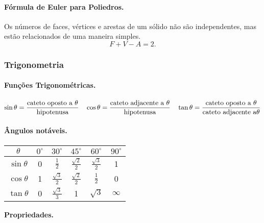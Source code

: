 \paragraph{Fórmula de Euler para Poliedros.} Os números de faces, vértices e arestas de um sólido não são independentes, mas estão relacionados de uma maneira simples.
$$F + V - A = 2.$$

\subsubsection{Trigonometria}
\paragraph{Funções Trigonométricas.}
	$$\sin\theta = \frac{\textnormal{cateto oposto a }\theta}{\textnormal{hipotenusa}}  \quad \cos\theta = \frac{\textnormal{cateto adjacente a }\theta}{\textnormal{hipotenusa}} \quad \tan\theta = \frac{\textnormal{cateto oposto a }\theta}{\textnormal{cateto adjacente a}\theta}$$

\paragraph{Ângulos notáveis.}

\begin{center}
	\begin{tabular}{|c|c c c c c|}
		$\theta$ & $0^{\circ}$ & $30^{\circ}$&$45^{\circ}$&$60^{\circ}$&$90^{\circ}$ \\
		\hline
		\rule{0pt}{0.5cm}$\sin\theta$ &0&$\frac{1}{2}$&$\frac{\sqrt{2}}{2}$&$\frac{\sqrt{3}}{2}$&1 \\
		\hline
		\rule{0pt}{0.5cm}$\cos\theta$ &1&$\frac{\sqrt{3}}{2}$&$\frac{\sqrt{2}}{2}$&$\frac{1}{2}$&0 \\
		\hline
		\rule{0pt}{0.5cm}$\tan\theta$ &0&$\frac{\sqrt{3}}{3}$&1&$\sqrt{3}$&$\infty$ \\
		
	\end{tabular}
\end{center}

\textbf{Propriedades.}

